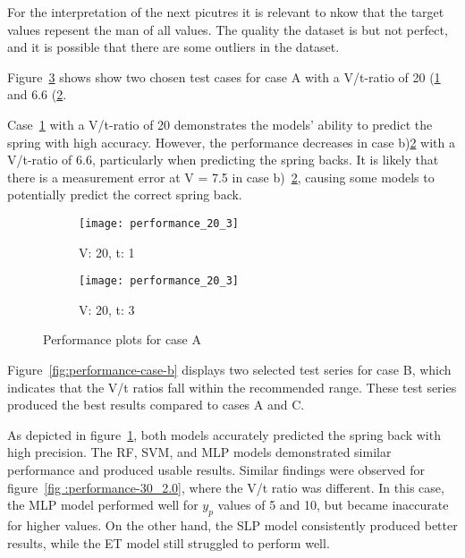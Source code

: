 For the interpretation of the next picutres it is relevant to nkow that the target values
repesent the man of all values.
The quality the dataset is but not perfect, and it is possible that there are some outliers in the
dataset.

Figure~\ref{fig:performance-case-a} shows show two chosen test cases for case A with a
V/t-ratio of 20 (\ref{fig:performance-20-1} and 6.6 (\ref{fig:performance-20-3}.

Case~\ref{fig:performance-20-1} with a V/t-ratio of 20 demonstrates the models'
ability to predict the spring with high accuracy.
However, the performance decreases in case b)\ref{fig:performance-20-3} with a V/t-ratio
of 6.6, particularly when predicting the spring backs.
It is likely that there is a measurement error at V = 7.5 in case
b)~\ref{fig:performance-20-3}, causing some models to potentially predict the correct
spring back.

\begin{figure}[H]
    \begin{tcolorbox}[arc=0pt,boxrule=0.5pt]
        \begin{subfigure}{0.5\textwidth}
            \texttt{[image: performance\_20\_3]}
            \caption{V: 20, t: 1}
            \label{fig:performance-20-1}
        \end{subfigure}
        \hfill
        \begin{subfigure}{0.5\textwidth}
            \texttt{[image: performance\_20\_3]}
            \caption{V: 20, t: 3}
            \label{fig:performance-20-3}
        \end{subfigure}
    \end{tcolorbox}
    \caption{Performance plots for case A}
    \label{fig:performance-case-a}
\end{figure}


Figure~\ref{fig:performance-case-b} displays two selected test series for case B, which indicates
that the V/t ratios fall within the recommended range. These test series produced the best
results compared to cases A and C.

As depicted in figure~\ref{fig:performance-20-1}, both models accurately predicted the spring
back with high precision. The \ac{RF}, \ac{SVM}, and \ac{MLP} models demonstrated similar
performance and produced usable results. Similar findings were observed for figure~\ref{fig
:performance-30_2.0}, where the V/t ratio was different. In this case, the \ac{MLP} model
performed well for \(y_p\) values of 5 and 10, but became inaccurate for higher values. On the
other hand, the \ac{SLP} model consistently produced better results, while the \ac{ET} model
still struggled to perform well.

